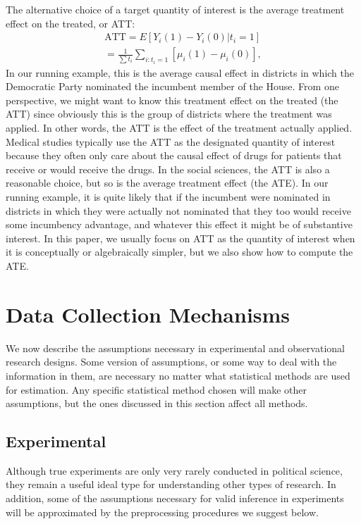 \documentclass[11pt,titlepage]{article}
\begin{document}
The alternative choice of a target quantity of interest is the average
treatment effect on the treated, or ATT:
\begin{align}
  \label{att}
  \text{ATT} = E[Y_i(1) - Y_i(0)|t_i=1] \\
             = \frac{1}{\sum t_i}\sum_{i:t_i=1}[\mu_i(1) - \mu_i(0)],
\end{align}
In our running example, this is the average causal effect in districts
in which the Democratic Party nominated the incumbent member of the
House.  From one perspective, we might want to know this treatment
effect on the treated (the ATT) since obviously this is the group of
districts where the treatment was applied.  In other words, the ATT is
the effect of the treatment actually applied.  Medical studies
typically use the ATT as the designated quantity of interest because
they often only care about the causal effect of drugs for patients
that receive or would receive the drugs.  In the social sciences, the
ATT is also a reasonable choice, but so is the average treatment
effect (the ATE).  In our running example, it is quite likely that if
the incumbent were nominated in districts in which they were actually
not nominated that they too would receive some incumbency advantage,
and whatever this effect it might be of substantive interest.  In this
paper, we usually focus on ATT as the quantity of interest when it is
conceptually or algebraically simpler, but we also show how to compute
the ATE.

\section{Data Collection Mechanisms}

We now describe the assumptions necessary in experimental and
observational research designs.  Some version of assumptions, or some
way to deal with the information in them, are necessary no matter what
statistical methods are used for estimation.  Any specific statistical
method chosen will make other assumptions, but the ones discussed in
this section affect all methods.

\subsection{Experimental}

Although true experiments are only very rarely conducted in political
science, they remain a useful ideal type for understanding other types
of research.  In addition, some of the assumptions necessary for valid
inference in experiments will be approximated by the preprocessing
procedures we suggest below.
\end{document}
